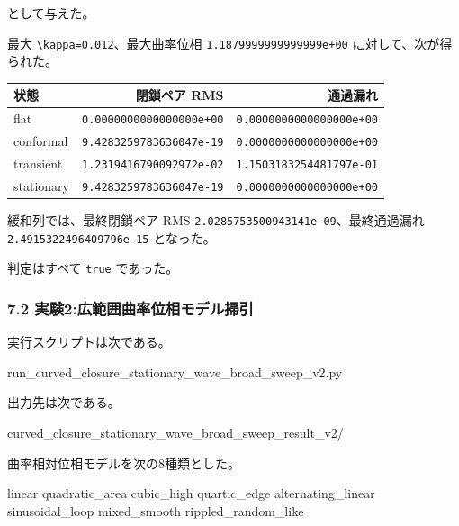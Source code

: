 \documentclass[
  a4paper,
]{article}
\newenvironment{Shaded}{}{}
\newcommand{\NormalTok}[1]{#1}
\newcounter{none} %
\begin{document}
として与えた。

最大 \texttt{\textbackslash{}kappa=0.012}、最大曲率位相
\texttt{1.1879999999999999e+00} に対して、次が得られた。

{\def\LTcaptype{none} %
\begin{longtable}[]{@{}lrr@{}}
\toprule\noalign{}
状態 & 閉鎖ペア RMS & 通過漏れ \\
\midrule\noalign{}
\endhead
\bottomrule\noalign{}
\endlastfoot
flat & \texttt{0.0000000000000000e+00} &
\texttt{0.0000000000000000e+00} \\
conformal & \texttt{9.4283259783636047e-19} &
\texttt{0.0000000000000000e+00} \\
transient & \texttt{1.2319416790092972e-02} &
\texttt{1.1503183254481797e-01} \\
stationary & \texttt{9.4283259783636047e-19} &
\texttt{0.0000000000000000e+00} \\
\end{longtable}
}

緩和列では、最終閉鎖ペア RMS
\texttt{2.0285753500943141e-09}、最終通過漏れ
\texttt{2.4915322496409796e-15} となった。

判定はすべて \texttt{true} であった。

\subsubsection{7.2
実験2:広範囲曲率位相モデル掃引}\label{ux5b9fux9a132ux5e83ux7bc4ux56f2ux66f2ux7387ux4f4dux76f8ux30e2ux30c7ux30ebux6383ux5f15}

実行スクリプトは次である。

\begin{Shaded}
\begin{Highlighting}[]
\NormalTok{run\_curved\_closure\_stationary\_wave\_broad\_sweep\_v2.py}
\end{Highlighting}
\end{Shaded}

出力先は次である。

\begin{Shaded}
\begin{Highlighting}[]
\NormalTok{curved\_closure\_stationary\_wave\_broad\_sweep\_result\_v2/}
\end{Highlighting}
\end{Shaded}

曲率相対位相モデルを次の8種類とした。

\begin{Shaded}
\begin{Highlighting}[]
\NormalTok{linear}
\NormalTok{quadratic\_area}
\NormalTok{cubic\_high}
\NormalTok{quartic\_edge}
\NormalTok{alternating\_linear}
\NormalTok{sinusoidal\_loop}
\NormalTok{mixed\_smooth}
\NormalTok{rippled\_random\_like}
\end{Highlighting}
\end{Shaded}
\end{document}
